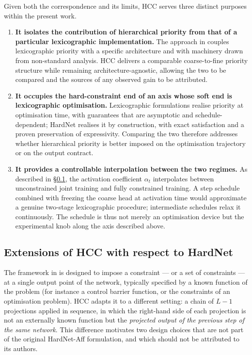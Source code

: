 Given both the correspondence and its limits, HCC serves three distinct purposes within the present work.

\begin{enumerate}
    \item \textbf{It isolates the contribution of hierarchical priority from that of a particular lexicographic implementation.} The approach in \cite{fiaschi2024informed} couples lexicographic priority with a specific architecture and with machinery drawn from non-standard analysis. HCC delivers a comparable coarse-to-fine priority structure while remaining architecture-agnostic, allowing the two to be compared and the sources of any observed gain to be attributed.
    \item \textbf{It occupies the hard-constraint end of an axis whose soft end is lexicographic optimisation.} Lexicographic formulations realise priority at optimisation time, with guarantees that are asymptotic and schedule-dependent; HardNet realises it by construction, with exact satisfaction and a proven preservation of expressivity. Comparing the two therefore addresses whether hierarchical priority is better imposed on the optimisation trajectory or on the output contract.
    \item \textbf{It provides a controllable interpolation between the two regimes.} As described in \S\ref{ssec:hcc_extensions}, the activation coefficient $\alpha_t$ interpolates between unconstrained joint training and fully constrained training. A step schedule combined with freezing the coarse head at activation time would approximate a genuine two-stage lexicographic procedure; intermediate schedules relax it continuously. The schedule is thus not merely an optimisation device but the experimental knob along the axis described above.
\end{enumerate}

\subsection{Extensions of HCC with respect to HardNet}
\label{ssec:hcc_extensions}

The framework in \cite{min2024hardnet} is designed to impose a constraint --- or a set of constraints --- at a single output point of the network, typically specified by a known function of the problem (for instance a control barrier function, or the constraints of an optimisation problem). HCC adapts it to a different setting: a chain of $L-1$ projections applied in sequence, in which the right-hand side of each projection is not an externally known function but the \emph{projected output of the previous step of the same network}. This difference motivates two design choices that are not part of the original HardNet-Aff formulation, and which should not be attributed to its authors.

